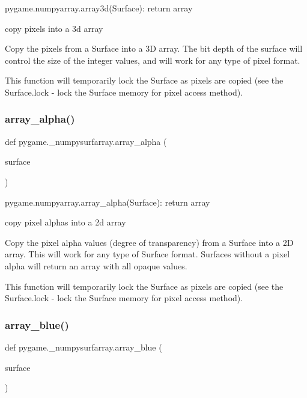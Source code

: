\begin{DoxyVerb}pygame.numpyarray.array3d(Surface): return array

copy pixels into a 3d array

Copy the pixels from a Surface into a 3D array. The bit depth of the
surface will control the size of the integer values, and will work
for any type of pixel format.

This function will temporarily lock the Surface as pixels are copied
(see the Surface.lock - lock the Surface memory for pixel access
method).
\end{DoxyVerb}
 \mbox{\label{namespacepygame_1_1__numpysurfarray_a3c85557facaa59435ab157a32dd6299a}} 
\subsubsection{\texorpdfstring{array\+\_\+alpha()}{array\_alpha()}}
{\footnotesize\ttfamily def pygame.\+\_\+numpysurfarray.\+array\+\_\+alpha (\begin{DoxyParamCaption}\item[{}]{surface }\end{DoxyParamCaption})}

\begin{DoxyVerb}pygame.numpyarray.array_alpha(Surface): return array

copy pixel alphas into a 2d array

Copy the pixel alpha values (degree of transparency) from a Surface
into a 2D array. This will work for any type of Surface
format. Surfaces without a pixel alpha will return an array with all
opaque values.

This function will temporarily lock the Surface as pixels are copied
(see the Surface.lock - lock the Surface memory for pixel access
method).
\end{DoxyVerb}
 \mbox{\label{namespacepygame_1_1__numpysurfarray_ab76ee18e25cf0a3203c617ce6bc0f929}} 
\subsubsection{\texorpdfstring{array\+\_\+blue()}{array\_blue()}}
{\footnotesize\ttfamily def pygame.\+\_\+numpysurfarray.\+array\+\_\+blue (\begin{DoxyParamCaption}\item[{}]{surface }\end{DoxyParamCaption})}

